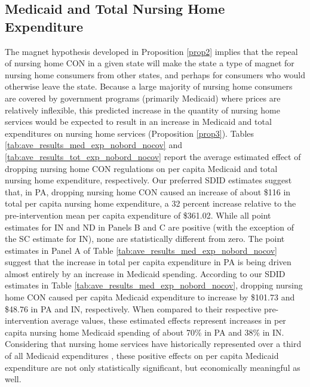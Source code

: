 \documentclass[../Main.tex]{subfiles}
\begin{document}
\subsection{Medicaid and Total Nursing Home Expenditure}

The magnet hypothesis developed in Proposition \ref{prop2} implies that the repeal of nursing home CON in a given state will make the state a type of magnet for nursing home consumers from other states, and perhaps for consumers who would otherwise leave the state. Because a large majority of nursing home consumers are covered by government programs (primarily Medicaid) where prices are relatively inflexible, this predicted increase in the quantity of nursing home services would be expected to result in an increase in Medicaid and total expenditures on nursing home services (Proposition \ref{prop3}). Tables \ref{tab:ave_results_med_exp_nobord_nocov} and \ref{tab:ave_results_tot_exp_nobord_nocov} report the average estimated effect of dropping nursing home CON regulations on per capita Medicaid and total nursing home expenditure, respectively. Our preferred SDID estimates suggest that, in PA, dropping nursing home CON caused an increase of about \$116 in total per capita nursing home expenditure, a 32 percent increase relative to the pre-intervention mean per capita expenditure of \$361.02. While all point estimates for IN and ND in Panels B and C are positive (with the exception of the SC estimate for IN), none are statistically different from zero. The point estimates in Panel A of Table \ref{tab:ave_results_med_exp_nobord_nocov} suggest that the increase in total per capita expenditure in PA is being driven almost entirely by an increase in Medicaid spending. According to our SDID estimates in Table \ref{tab:ave_results_med_exp_nobord_nocov}, dropping nursing home CON caused per capita Medicaid expenditure to increase by \$101.73 and \$48.76 in PA and IN, respectively. When compared to their respective pre-intervention average values, these estimated effects represent increases in per capita nursing home Medicaid spending of about 70\% in PA and 38\% in IN. Considering that nursing home services have historically represented over a third of all Medicaid expenditures \citep{wiener1999controlling}, these positive effects on per capita Medicaid expenditure are not only statistically significant, but economically meaningful as well.\\
\end{document}
